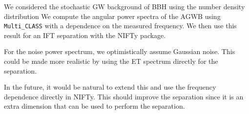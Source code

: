 We considered the stochastic GW background of BBH using the number density distribution We compute the angular power spectra of the AGWB using {\tt Multi\_CLASS} with a dependence on the measured frequency. We then use this result for an IFT separation with the NIFTy package. 

For the noise power spectrum, we optimistically assume Gaussian noise. This could be made more realistic by using the ET spectrum directly for the separation. 

In the future, it would be natural to extend this and use the frequency dependence directly in NIFTy. This should improve the separation since it is an extra dimension that can be used to perform the separation.
